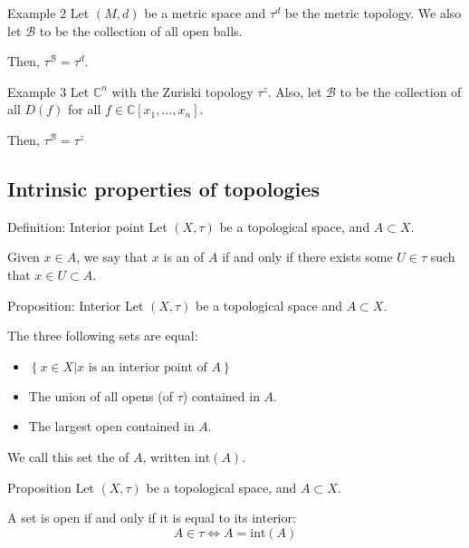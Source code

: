 \documentclass[a4paper]{article}
\begin{document}
\begin{parag}{Example 2}
    Let $\left(M, d\right)$ be a metric space and $\tau^d$ be the metric topology. We also let $\mathcal{B}$ to be the collection of all open balls.

    Then, $\tau^{\mathcal{B}} = \tau^d$.
\end{parag}

\begin{parag}{Example 3}
    Let $\mathbb{C}^n$ with the Zuriski topology $\tau^z$. Also, let $\mathcal{B}$ to be the collection of all $D\left(f\right)$ for all $f \in \mathcal{\mathbb{C}}\left[x_1, \ldots, x_n\right]$.

    Then, $\tau^{\mathcal{B}} = \tau^z$
\end{parag}

\subsection{Intrinsic properties of topologies}

\begin{parag}{Definition: Interior point}
    Let $\left(X, \tau\right)$ be a topological space, and $A \subset X$.

    Given $x \in A$, we say that $x$ is an  of $A$ if and only if there exists some $U \in \tau$ such that $x \in U \subset A$.
\end{parag}

\begin{parag}{Proposition: Interior}
    Let $\left(X, \tau\right)$ be a topological space and $A \subset X$.

    The three following sets are equal:
    \begin{itemize}
        \item $\displaystyle \left\{x \in X | x \text{ is an interior point of }  A\right\}$
        \item The union of all opens (of $\tau$) contained in $A$.
        \item The largest open contained in $A$.
    \end{itemize}
    
    We call this set the  of $A$, written $\text{int}\left(A\right)$.
\end{parag}

\begin{parag}{Proposition}
    Let $\left(X, \tau\right)$ be a topological space, and $A \subset X$.

    A set is open if and only if it is equal to its interior: 
    \[A \in \tau \iff A = \text{int}\left(A\right)\]
\end{parag}
\end{document}
